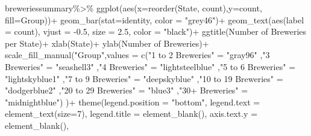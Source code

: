 \documentclass[
]{article}
\newenvironment{Shaded}{\begin{snugshade}}{\end{snugshade}}
\newcommand{\AttributeTok}[1]{\textcolor[rgb]{0.77,0.63,0.00}{#1}}
\newcommand{\DecValTok}[1]{\textcolor[rgb]{0.00,0.00,0.81}{#1}}
\newcommand{\FloatTok}[1]{\textcolor[rgb]{0.00,0.00,0.81}{#1}}
\newcommand{\FunctionTok}[1]{\textcolor[rgb]{0.00,0.00,0.00}{#1}}
\newcommand{\NormalTok}[1]{#1}
\newcommand{\OtherTok}[1]{\textcolor[rgb]{0.56,0.35,0.01}{#1}}
\newcommand{\SpecialCharTok}[1]{\textcolor[rgb]{0.00,0.00,0.00}{#1}}
\newcommand{\StringTok}[1]{\textcolor[rgb]{0.31,0.60,0.02}{#1}}
\begin{document}
\begin{Shaded}
\begin{Highlighting}[]
\NormalTok{breweriessummary}\SpecialCharTok{\%\textgreater{}\%}
  \FunctionTok{ggplot}\NormalTok{(}\FunctionTok{aes}\NormalTok{(}\AttributeTok{x=}\FunctionTok{reorder}\NormalTok{(State, count),}\AttributeTok{y=}\NormalTok{count, }\AttributeTok{fill=}\NormalTok{Group))}\SpecialCharTok{+}
  \FunctionTok{geom\_bar}\NormalTok{(}\AttributeTok{stat=}\StringTok{\textquotesingle{}identity\textquotesingle{}}\NormalTok{, }\AttributeTok{color =} \StringTok{"grey46"}\NormalTok{)}\SpecialCharTok{+}
  \FunctionTok{geom\_text}\NormalTok{(}\FunctionTok{aes}\NormalTok{(}\AttributeTok{label  =}\NormalTok{ count), }\AttributeTok{vjust =} \SpecialCharTok{{-}}\FloatTok{0.5}\NormalTok{, }\AttributeTok{size =} \FloatTok{2.5}\NormalTok{, }\AttributeTok{color =} \StringTok{"black"}\NormalTok{)}\SpecialCharTok{+}
  \FunctionTok{ggtitle}\NormalTok{(}\StringTok{\textquotesingle{}Number of Breweries per State\textquotesingle{}}\NormalTok{)}\SpecialCharTok{+}
  \FunctionTok{xlab}\NormalTok{(}\StringTok{\textquotesingle{}State\textquotesingle{}}\NormalTok{)}\SpecialCharTok{+}
  \FunctionTok{ylab}\NormalTok{(}\StringTok{\textquotesingle{}Number of Breweries\textquotesingle{}}\NormalTok{)}\SpecialCharTok{+}
  \FunctionTok{scale\_fill\_manual}\NormalTok{(}\StringTok{"Group"}\NormalTok{,}\AttributeTok{values =} \FunctionTok{c}\NormalTok{(}\StringTok{"1 to 2 Breweries"} \OtherTok{=} \StringTok{"gray96"}
\NormalTok{                                       ,}\StringTok{"3 Breweries"} \OtherTok{=} \StringTok{"seashell3"}
\NormalTok{                                       ,}\StringTok{"4 Breweries"} \OtherTok{=} \StringTok{"lightsteelblue"}
\NormalTok{                                       ,}\StringTok{"5 to 6 Breweries"}  \OtherTok{=} \StringTok{"lightskyblue1"}
\NormalTok{                                       ,}\StringTok{"7 to 9 Breweries"} \OtherTok{=} \StringTok{"deepskyblue"}
\NormalTok{                                       ,}\StringTok{"10 to 19 Breweries"} \OtherTok{=} \StringTok{"dodgerblue2"}
\NormalTok{                                       ,}\StringTok{"20 to 29 Breweries"} \OtherTok{=} \StringTok{"blue3"}
\NormalTok{                                       ,}\StringTok{"30+ Breweries"} \OtherTok{=} \StringTok{"midnightblue"}\NormalTok{) )}\SpecialCharTok{+}
  \FunctionTok{theme}\NormalTok{(}\AttributeTok{legend.position =} \StringTok{"bottom"}\NormalTok{,}
        \AttributeTok{legend.text =} \FunctionTok{element\_text}\NormalTok{(}\AttributeTok{size=}\DecValTok{7}\NormalTok{),}
        \AttributeTok{legend.title =} \FunctionTok{element\_blank}\NormalTok{(),}
        \AttributeTok{axis.text.y =} \FunctionTok{element\_blank}\NormalTok{(),}

\end{Highlighting}
\end{Shaded}
\end{document}

